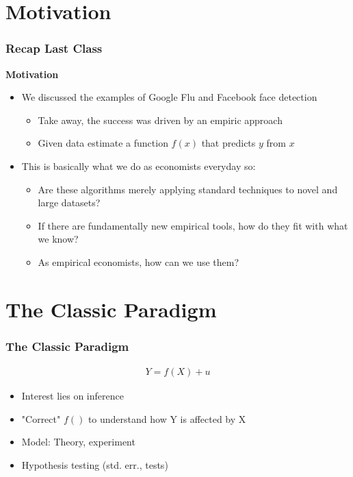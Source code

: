 \documentclass[
  shownotes,
  xcolor={svgnames},
  hyperref={colorlinks,citecolor=DarkBlue,linkcolor=DarkRed,urlcolor=DarkBlue}
  ]{beamer}
\begin{document}
\section{Motivation}
\begin{frame}
\frametitle{Recap Last Class}


{\bf Motivation}

\bigskip

\begin{itemize}
      \item We discussed the examples of Google Flu and Facebook face detection
      \medskip
      \begin{itemize}
        \item Take away, the success was driven by an empiric approach
        \item Given data  estimate a function $f(x)$ that predicts $y$ from $x$
      \end{itemize}
      \medskip
      
      \item  This is basically what we do as economists everyday so: 
      \begin{itemize}
        \item  Are these algorithms merely applying standard techniques to novel and large datasets? 
        \item  If there are fundamentally new empirical tools, how do they fit with what we know? 
        \item  As empirical economists, how can we use them? 
       \end{itemize}
\end{itemize}

\end{frame}


\section{The Classic Paradigm}
\begin{frame}
\frametitle{The Classic Paradigm}


\begin{align}
Y=f(X)+u
\end{align}
\medskip
\begin{itemize}
  \item Interest lies on inference 
  \medskip
  \item "Correct" $f()$ to understand how Y is affected by X
  \medskip
  \item Model: Theory, experiment
  \medskip
  \item Hypothesis testing (std. err., tests)
\end{itemize}

\end{frame}
\end{document}
